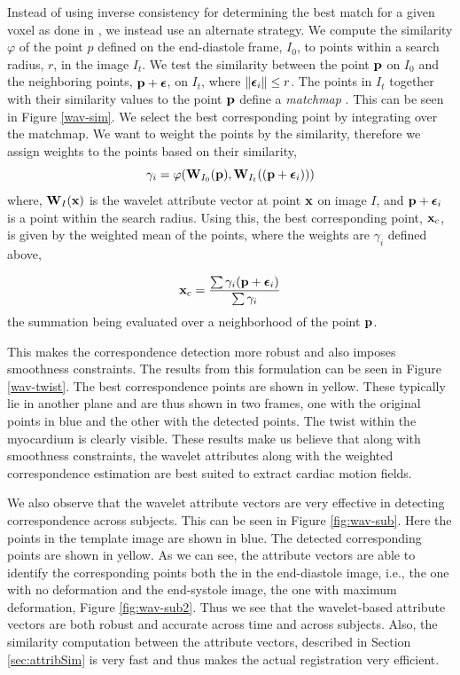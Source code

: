 Instead of using inverse consistency for determining the best match for a given voxel as done in \cite{wav}, we instead use an alternate strategy. We compute the similarity $\varphi$ of the point $p$ defined on the end-diastole frame, $I_0$, to points within a search radius, $r$, in the image $I_t$. We test the similarity between the point $\mathbf{p}$ on $I_0$ and the neighboring points, $\mathbf{p} + {\boldsymbol{\epsilon}}$, on $I_t$, where $\|{\boldsymbol{\epsilon}}_i\| \le r$. The points in $I_t$ together with their similarity values to the point $\mathbf{p}$ define a {\em matchmap} \cite{guest01}. This can be seen in Figure \ref{wav-sim}. We select the best corresponding point by integrating over the matchmap. We want to weight the points by the similarity, therefore we assign weights to the points based on their similarity,
\[
	\gamma_i = \varphi(\mathbf{W}_{I_0}(\mathbf{p}), \mathbf{W}_{I_t}((\mathbf{p} + {\boldsymbol{\epsilon}}_i)))
\]
where, $\mathbf{W}_I(\mathbf{x})$ is the wavelet attribute vector at point $\mathbf{x}$ on image $I$, and $\mathbf{p} + {\boldsymbol{\epsilon}}_i$ is a point within the search radius.
Using this, the best corresponding point, $\mathbf{x}_c$, is given by the weighted mean of the points, where the weights are $\gamma_i$ defined above, 

\[
\mathbf{x}_c = \frac {\sum \gamma_i (\mathbf{p} + {\boldsymbol{\epsilon}}_i) } { \sum \gamma_i }
\]
the summation being evaluated over a neighborhood of the point $\mathbf{p}$.

This makes the correspondence detection more robust and also imposes smoothness constraints. The results from this formulation can be seen in Figure \ref{wav-twist}. The best correspondence points are shown in yellow. These typically lie in another plane and are thus shown in two frames, one with the original points in blue and the other with the detected points. The twist within the myocardium is clearly visible. These results make us believe that along with smoothness constraints, the wavelet attributes along with the weighted correspondence estimation are best suited to extract cardiac motion fields.

We also observe that the wavelet attribute vectors are very effective in detecting correspondence across subjects. This can be seen in Figure \ref{fig:wav-sub}. Here the points in the template image are shown in blue. The detected corresponding points are shown in yellow. As we can see, the attribute vectors are able to identify the corresponding points both the in the end-diastole image, i.e., the one with no deformation and the end-systole image, the one with maximum deformation, Figure \ref{fig:wav-sub2}. Thus we see that the wavelet-based attribute vectors are both robust and accurate across time and across subjects. Also, the similarity computation between the attribute vectors, described in Section \ref{sec:attribSim} is very fast and thus makes the actual registration very efficient. 

